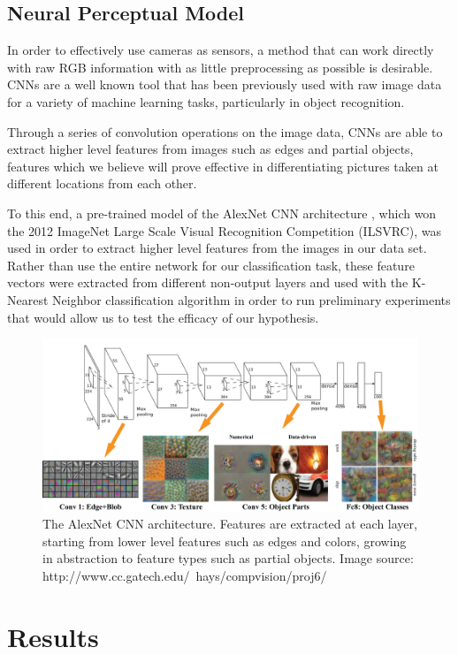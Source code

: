\documentclass[letterpaper, 12 pt, conference]{ieeeconf}  %
\begin{document}
\subsection{Neural Perceptual Model}
In order to effectively use cameras as sensors, a method that can work directly with raw RGB information with as little preprocessing as possible is desirable. CNNs are a well known tool that has been previously used with raw image data for a variety of machine learning tasks, particularly in object recognition. 
\par
Through a series of convolution operations on the image data, CNNs are able to extract higher level features from images such as edges and partial objects, features which we believe will prove effective in differentiating pictures taken at different locations from each other. 
\par
To this end, a pre-trained model of the AlexNet CNN architecture \cite{AlexNet}, which won the 2012 ImageNet Large Scale Visual Recognition Competition (ILSVRC), was used in order to extract higher level features from the images in our data set. Rather than use the entire network for our classification task, these feature vectors were extracted from different non-output layers and used with the K-Nearest Neighbor classification algorithm in order to run preliminary experiments that would allow us to test the efficacy of our hypothesis.  

\begin{figure}[h]
\centering
\includegraphics[scale=0.70]{alexnet}
\caption{The AlexNet CNN architecture. Features are extracted at each layer, starting from lower level features such as edges and colors, growing in abstraction to feature types such as partial objects. Image source: http://www.cc.gatech.edu/~hays/compvision/proj6/}
\end{figure}



\section{Results}
\end{document}
